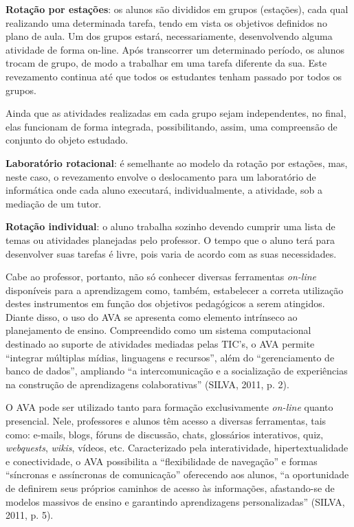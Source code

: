 \documentclass[
	12pt,				%
	openright,			%
  oneside,     %
	a4paper,			%
	chapter=TITLE,		%
	english,			%
	french,				%
	spanish,			%
	brazil				%
	]{abntex2}
\begin{document}
\noindent \textbf{Rotação por estações}: os alunos são divididos em grupos (estações), cada qual realizando uma determinada tarefa, tendo em vista os objetivos definidos no plano de aula. Um dos grupos estará, necessariamente, desenvolvendo alguma atividade de forma on-line. Após transcorrer um determinado período, os alunos trocam de grupo, de modo a trabalhar em uma tarefa diferente da sua. Este revezamento continua até que todos os estudantes tenham passado por todos os grupos. 

Ainda que as atividades realizadas em cada grupo sejam independentes, no final, elas funcionam de forma integrada, possibilitando, assim, uma compreensão de conjunto do objeto estudado.

\noindent \textbf{Laboratório rotacional}: é semelhante ao modelo da rotação por estações, mas, neste caso, o revezamento envolve o deslocamento para um laboratório de informática onde cada aluno executará, individualmente, a atividade, sob a mediação de um tutor.

\noindent \textbf{Rotação individual}: o aluno trabalha sozinho devendo cumprir uma lista de temas ou atividades planejadas pelo professor. O tempo que o aluno terá para desenvolver suas tarefas é livre, pois varia de acordo com as suas necessidades.

Cabe ao professor, portanto, não só conhecer diversas ferramentas \textit{on-line} disponíveis para a aprendizagem como, também, estabelecer a correta utilização destes instrumentos em função dos objetivos pedagógicos a serem atingidos. Diante disso, o uso do AVA se apresenta como elemento intrínseco ao planejamento de ensino. Compreendido como um sistema computacional destinado ao suporte de atividades mediadas pelas TIC's, o AVA permite ``integrar múltiplas mídias, linguagens e recursos'', além do ``gerenciamento de banco de dados'', ampliando ``a intercomunicação e a socialização de experiências na construção de aprendizagens colaborativas'' (SILVA, 2011, p. 2).
	
O AVA pode ser utilizado tanto para formação exclusivamente \textit{on-line} quanto presencial. Nele, professores e alunos têm acesso a diversas ferramentas, tais como: e-mails, blogs, fóruns de discussão, chats, glossários interativos, quiz, \textit{webquests}, \textit{wikis}, vídeos, etc. Caracterizado pela interatividade, hipertextualidade e conectividade, o AVA possibilita a ``flexibilidade de navegação'' e formas ``síncronas e assíncronas de comunicação'' oferecendo aos alunos, ``a oportunidade de definirem seus próprios caminhos de acesso às informações, afastando-se de modelos massivos de ensino e garantindo aprendizagens personalizadas'' (SILVA, 2011, p. 5).
\end{document}
